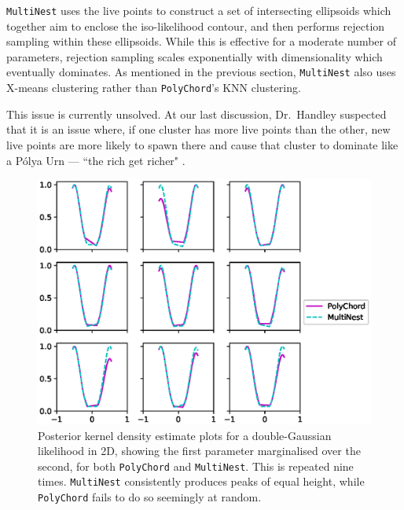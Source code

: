 \documentclass{article}
\begin{document}
\texttt{MultiNest} uses the live points to construct a set of intersecting ellipsoids which together aim to enclose the iso-likelihood contour, and then performs rejection sampling within these ellipsoids. While this is effective for a moderate number of parameters, rejection sampling scales exponentially with dimensionality which eventually dominates. As mentioned in the previous section, \texttt{MultiNest} also uses X-means clustering rather than \texttt{PolyChord}'s KNN clustering.

This issue is currently unsolved. At our last discussion, Dr.~Handley suspected that it is an issue where, if one cluster has more live points than the other, new live points are more likely to spawn there and cause that cluster to dominate like a P\'olya Urn --- ``the rich get richer" \cite{PolyaUrn}.

\begin{figure}[!ht]
  \centering
  \includegraphics{polynestcomparison.eps}
  \caption{Posterior kernel density estimate plots for a double-Gaussian likelihood in 2D, showing the first parameter marginalised over the second, for both \texttt{PolyChord} and \texttt{MultiNest}. This is repeated nine times. \texttt{MultiNest} consistently produces peaks of equal height, while \texttt{PolyChord} fails to do so seemingly at random.}
  \label{fig:polynest}
\end{figure}

\newpage


\newpage
\end{document}
